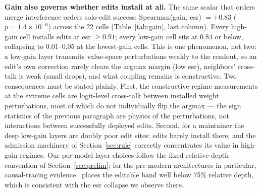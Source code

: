 \documentclass[preprint,12pt]{elsarticle}
\begin{document}
\textbf{Gain also governs whether edits install at all.} The same scalar that orders
merge interference orders solo-edit success: Spearman(gain, esr) $=+0.83$
($p=1.4\times10^{-6}$) across the 22 cells (Table~\ref{tab:gain}, last column).
Every high-gain cell installs edits at esr $\geq0.91$; every low-gain cell sits at
$0.84$ or below, collapsing to $0.01$--$0.05$ at the lowest-gain cells. This is one
phenomenon, not two: a low-gain layer transmits value-space perturbations weakly to
the readout, so an edit's own correction rarely clears the argmax margin (low esr),
neighbors' cross-talk is weak (small drops), and what coupling remains is
constructive. Two consequences must be stated plainly. First, the constructive-regime
measurements at the extreme cells are logit-level cross-talk between installed weight
perturbations, most of which do not individually flip the argmax --- the sign
statistics of the previous paragraph are physics of the perturbations, not
interactions between successfully deployed edits. Second, for a maintainer the deep
low-gain layers are doubly poor edit sites: edits barely install there, and the
admission machinery of Section~\ref{sec:rule} correctly concentrates its value in
high-gain regimes. Our per-model layer choices follow the fixed relative-depth
convention of Section~\ref{sec:prelim}; for the pre-modern architectures in
particular, causal-tracing evidence~\cite{rome2022} places the editable band well
below 75\% relative depth, which is consistent with the esr collapse we observe
there.
\end{document}
